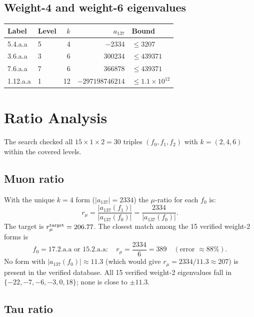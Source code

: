 \documentclass[12pt,a4paper]{article}
\begin{document}
\subsection{Weight-4 and weight-6 eigenvalues}

\begin{center}
\begin{tabular}{llrrl}
\toprule
Label & Level & $k$ & $a_{137}$ & Bound \\
\midrule
5.4.a.a   & 5 & 4 & $-2334$   & $\le 3207$ \\
3.6.a.a   & 3 & 6 & $300234$  & $\le 439371$ \\
7.6.a.a   & 7 & 6 & $366878$  & $\le 439371$ \\
1.12.a.a  & 1 & 12 & $-297198746214$ & $\le 1.1\times10^{12}$ \\
\bottomrule
\end{tabular}
\end{center}

\section{Ratio Analysis}

The search checked all $15 \times 1 \times 2 = 30$ triples
$(f_0, f_1, f_2)$ with $k = (2,4,6)$ within the covered levels.

\subsection{Muon ratio}

With the unique $k=4$ form ($|a_{137}| = 2334$) the $\mu$-ratio for each
$f_0$ is:
\[
  r_\mu = \frac{|a_{137}(f_1)|}{|a_{137}(f_0)|} = \frac{2334}{|a_{137}(f_0)|}.
\]
The target is $r_\mu^{\rm target} = 206.77$.  The closest match among the
15 verified weight-2 forms is
\[
  f_0 = \text{17.2.a.a or 15.2.a.a}: \quad
  r_\mu = \frac{2334}{6} = 389 \quad (\text{error } \approx 88\%).
\]
No form with $|a_{137}(f_0)| \approx 11.3$ (which would give
$r_\mu = 2334/11.3 \approx 207$) is present in the verified database.
All 15 verified weight-2 eigenvalues fall in $\{-22, -7, -6, -3, 0, 18\}$;
none is close to $\pm 11.3$.

\subsection{Tau ratio}
\end{document}

